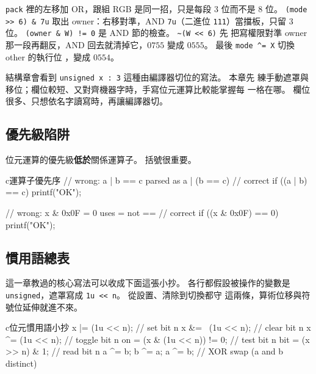 
\texttt{pack} 裡的左移加 OR，跟組 RGB 是同一招，只是每段 $3$ 位而不是
$8$ 位。 \texttt{(mode >> 6) \& 7u} 取出 owner：右移對準，AND
\texttt{7u}（二進位 \texttt{111}）當擋板，只留 $3$ 位。
\texttt{(owner \& W) != 0} 是 AND 節的檢查。 \texttt{\~{}(W << 6)} 先
把寫權限對準 owner 那一段再翻反，AND 回去就清掉它，$0755$ 變成
$0555$。 最後 \texttt{mode \textasciicircum{}= X} 切換 other 的執行位
，變成 $0554$。

結構章會看到 \texttt{unsigned x : 3} 這種由編譯器切位的寫法。 本章先
練手動遮罩與移位；欄位較短、又對齊機器字時，手寫位元運算比較能掌握每
一格在哪。 欄位很多、只想依名字讀寫時，再讓編譯器切。

\subsection{優先級陷阱}

位元運算的優先級\textbf{低於}關係運算子。 括號很重要。

\begin{code}{c}{運算子優先序}
// wrong: a | b == c parsed as a | (b == c)
// correct
if ((a | b) == c) {
    printf("OK\n");
}

// wrong: x & 0x0F = 0 uses = not ==
// correct
if ((x & 0x0F) == 0) {
    printf("OK\n");
}
\end{code}


\subsection{慣用語總表}

這一章教過的核心寫法可以收成下面這張小抄。 各行都假設被操作的變數是
\texttt{unsigned}，遮罩寫成 \texttt{1u << n}。 從設置、清除到切換都守
這兩條，算術位移與符號位延伸就進不來。

\begin{code}{c}{位元慣用語小抄}
x |=  (1u << n);              // set bit n
x &= ~(1u << n);              // clear bit n
x ^=  (1u << n);              // toggle bit n
on  = (x & (1u << n)) != 0;   // test bit n
bit = (x >> n) & 1;           // read bit n
a ^= b; b ^= a; a ^= b;       // XOR swap (a and b distinct)
\end{code}

